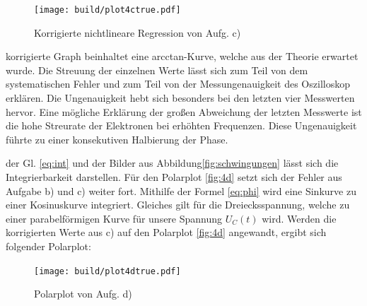   \begin{figure}[H]
    \texttt{[image: build/plot4ctrue.pdf]}
    \centering
    \caption{Korrigierte nichtlineare Regression von Aufg. c)}
    \label{fig:4ctrue}
  \end{figure}

 \justifying korrigierte Graph beinhaltet eine arcctan-Kurve, welche aus der Theorie 
erwartet wurde. Die Streuung der einzelnen Werte lässt sich zum Teil von dem 
systematischen Fehler und zum Teil von der Messungenauigkeit des Oszilloskop erklären.
Die Ungenauigkeit hebt sich besonders bei den letzten vier Messwerten hervor. 
Eine mögliche Erklärung der großen Abweichung der letzten Messwerte ist die hohe 
Streurate der Elektronen bei erhöhten Frequenzen. Diese Ungenauigkeit führte zu einer 
konsekutiven Halbierung der Phase.


 \justifying der Gl. \eqref{eq:int} und der Bilder aus Abbildung\ref{fig:schwingungen} 
lässt sich die Integrierbarkeit darstellen.
Für den Polarplot \ref{fig:4d} setzt sich der Fehler aus Aufgabe b) und c) weiter fort.
Mithilfe der Formel \eqref{eq:phi} wird eine Sinkurve zu einer Kosinuskurve integriert.
Gleiches gilt für die Dreiecksspannung, welche zu einer parabelförmigen
Kurve für unsere Spannung $U_C(t)$ wird.
Werden die korrigierten Werte aus c) auf den Polarplot \ref{fig:4d} angewandt, ergibt sich 
folgender Polarplot:

  \begin{figure}[H]
    \texttt{[image: build/plot4dtrue.pdf]}
    \centering
    \caption{Polarplot von Aufg. d)}
    \label{fig:4dtrue}
  \end{figure}

\newpage
\nocite{V353}
\nocite{scipy}
\nocite{uncertainties}
\printbibliography
